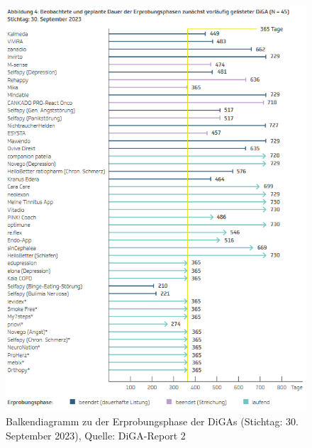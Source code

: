 \documentclass{article}
\begin{document}
			\begin{figure}[htbp]
				\centering
				\includegraphics[height=0.5\textheight]{./grafiken/erprobungs_phase_diga}
				\centering
				\caption[Erprobungsphase von den DiGAs]{Balkendiagramm zu der Erprobungsphase der DiGAs (Stichtag: 30. September 2023), Quelle: DiGA-Report 2 \cite{TK-Report-2}}
				\label{Abb-erprobungsphase-diga}
			\end{figure}
\end{document}
